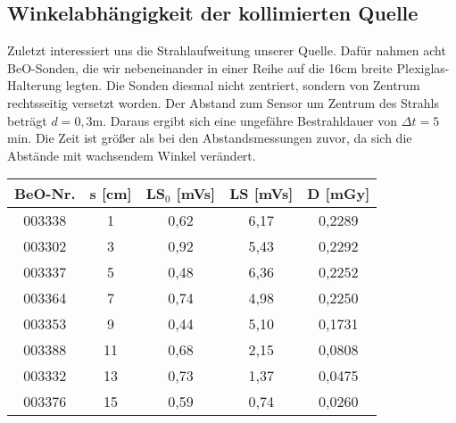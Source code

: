 \subsection{Winkelabhängigkeit der kollimierten Quelle}

Zuletzt interessiert uns die Strahlaufweitung unserer Quelle. Dafür nahmen acht BeO-Sonden, die wir nebeneinander in einer Reihe auf die 16cm breite Plexiglas-Halterung legten. Die Sonden diesmal nicht zentriert, sondern von Zentrum rechtsseitig versetzt worden. Der Abstand zum Sensor um Zentrum des Strahls beträgt $d = 0,3$m. Daraus ergibt sich eine ungefähre Bestrahldauer von $\Delta t = 5$min. Die Zeit ist größer als bei den Abstandsmessungen zuvor, da sich die Abstände mit wachsendem Winkel verändert.

	\begin{center}
		\begin{tabular}{c|c|c|c|c}
				\textbf{BeO-Nr.}& \textbf{s} [cm] & \textbf{LS$_0$} [mVs] & \textbf{LS} [mVs] & \textbf{D} [mGy] \\
		 \hline 003338 &  1 & 0,62 & 6,17 & 0,2289 \\
				003302 &  3 & 0,92 & 5,43 & 0,2292 \\
				003337 &  5 & 0,48 & 6,36 & 0,2252 \\
				003364 &  7 & 0,74 & 4,98 & 0,2250 \\
				003353 &  9 & 0,44 & 5,10 & 0,1731 \\
				003388 & 11	& 0,68 & 2,15 & 0,0808 \\
				003332 & 13 & 0,73 & 1,37 & 0,0475 \\
				003376 & 15 & 0,59 & 0,74 & 0,0260 \\
		\end{tabular}
	\end{center} 
